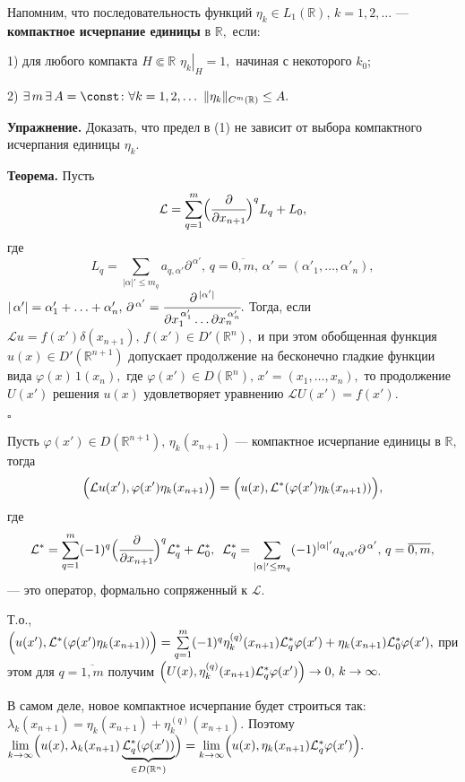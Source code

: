 \documentclass[unicode,12pt,draft]{article}
\begin{document}
Напомним, что последовательность функций $\eta_k\in L_1(\mathbb
R),\,k=1,2,\ldots$ --- \textbf{компактное исчерпание единицы } в
$\mathbb R,$ если:

1) для любого компакта $H\Subset\mathbb R\,\,
\left.\eta_k\right|_H=1,$ начиная с некоторого $k_0$;

2) $\exists\,m\,\exists\, A=\const  \colon \forall
k=1,2,\ldots\,\, \|\eta_k\|_{C^m(\mathbb R)}\le A.$

\textbf{Упражнение.} Доказать, что предел в (1) не зависит от
выбора компактного исчерпания единицы $\eta_k$.

\textbf{Теорема.} Пусть
$$\mathcal
L=\sum\limits_{q=1}^m\Bigl(\cfrac{\partial}{\partial
x_{n+1}}\Bigr)^q L_q+L_0,$$
где $$L_q=\sum\limits_{|\alpha|'\le
m_q}a_{q,\alpha'}{\partial^{\, \alpha'}},\,q=\overline{0,m},\,
\alpha'=(\alpha'_1,\ldots,\alpha'_n),$$
$|\,\alpha'|=\alpha'_1+\ldots+\alpha'_n,
\,\partial^{\,\alpha'}=\cfrac {\partial^{\,|\alpha'|}}{\partial
x_1^{\,\alpha'_1}\ldots
\partial x_n^{\,\alpha'_n}}.$ Тогда, если $\mathcal
L u=f(x')\delta(x_{n+1}),\,f(x')\in D'(\mathbb R^n),$ и при этом
обобщенная функция $u(x)\in D'(\mathbb R^{n+1})$ допускает
продолжение на бесконечно гладкие функции вида
$\varphi(x)\,1(x_{n}),$ где $\varphi(x')\in D(\mathbb
R^{n}),\,x'=(x_1,\ldots,x_n),$ то продолжение $U(x')$ решения
$u(x)$ удовлетворяет уравнению $\mathcal L U(x')=f(x').$

$\square$

Пусть $\varphi(x')\in D(\mathbb R^{n+1}),\,\eta_k(x_{n+1})$ ---
компактное исчерпание единицы в $\mathbb R,$ тогда
$$\Bigl(\mathcal L
u(x'),\varphi(x')\eta_k(x_{n+1})\Bigr)=\Bigl(u(x),\mathcal
L^*(\varphi(x')\eta_k(x_{n+1}))\Bigr),$$ где
$$\mathcal L^*=\sum\limits_{q=1}^m (-1)^q \Bigl( \cfrac{\partial}{\partial
x_{n+1}}\Bigr)^q \mathcal L^*_q + \mathcal L^*_0,\,\,\,\mathcal
L^*_q=\sum\limits_{|\alpha|'\le
m_q}(-1)^{|\alpha|'}a_{q,\alpha'}{\partial^{\,
\alpha'}},\,q=\overline{0,m},$$ --- это оператор, формально
сопряженный к $\mathcal L.$

Т.о., $\Bigl(u(x'),\mathcal L^*(\varphi(x')\eta_k(x_{n+1}))\Bigr)=
\sum\limits_{q=1}^m (-1)^q \eta_k^{(q)}(x_{n+1})\mathcal L^*_q
\varphi(x')+\eta_k(x_{n+1})\mathcal L^*_0\varphi(x'),$ при этом
для $q=\overline{1,m}$ получим
$\Bigl(U(x),\eta_k^{(q)}(x_{n+1})\mathcal
L^*_q\varphi(x')\Bigr)\to0,\,k\to{\infty}.$

В самом деле, новое компактное исчерпание будет строиться так:
$\lambda_k(x_{n+1})=\eta_k(x_{n+1})+\eta_k^{(q)}(x_{n+1}).$
Поэтому
$\lim\limits_{k\to\infty}\Bigl(u(x),\lambda_k(x_{n+1})\underbrace{\mathcal
L^*_q(\varphi(x'))}_{\in D(\mathbb R^n)}\Bigr)=
\lim\limits_{k\to\infty}\Bigl(u(x),\eta_k(x_{n+1})\mathcal
L^*_q\varphi(x')\Bigr).$
\end{document}
